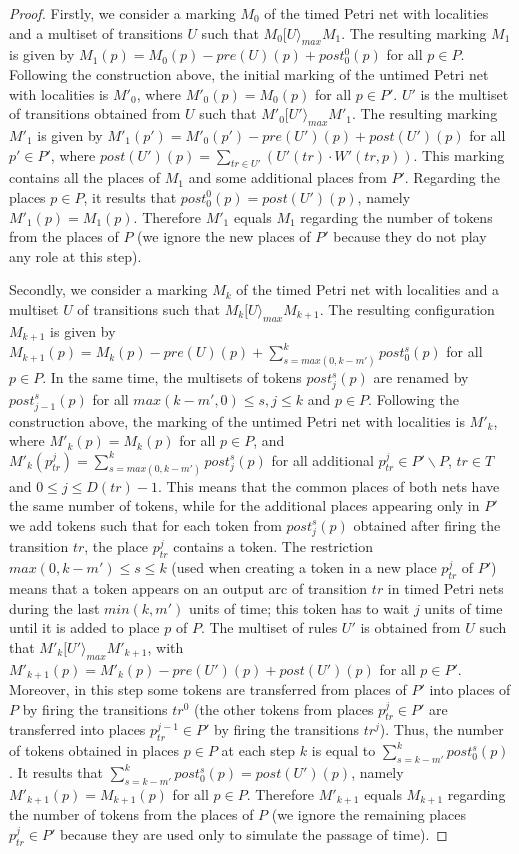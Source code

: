 \documentclass{eptcs}
\begin{document}
\begin{proof}
Firstly, we consider a marking $M_0$ of the timed Petri net with
localities and a multiset of transitions $U$ such that $M_0[U
\rangle_{max}M_{1}$. The resulting marking $M_{1}$ is given by
$M_1(p)=M_0(p)-pre(U)(p)+post^0_{0}(p)$ for all $p\in P$. Following
the construction above, the initial marking of the untimed Petri net
with localities is $M'_0$, where $M'_0(p)=M_0(p)$ for all $p \in P'$.
$U'$ is the multiset of transitions obtained from $U$ such that
$M'_0[U' \rangle_{max}M'_{1}$. The resulting marking $M'_{1}$ is
given by $M'_1(p')=M'_0(p')-pre(U')(p)+post(U')(p)$ for all $p'\in
P'$, where $post(U')(p)=\sum_{tr\in U'}( U'(tr) \cdot W'(tr,p))$.
This marking contains all the places of $M_1$ and some additional
places from $P'$. Regarding the places $p\in P$, it results that
$post^0_{0}(p)=post(U')(p)$, namely $M'_1(p)=M_1(p)$. Therefore
$M'_1$ equals $M_1$ regarding the number of tokens from the places
of $P$ (we ignore the new places of $P'$ because they do not play
any role at this step).

Secondly, we consider a marking $M_k$ of the timed Petri net with localities
and a multiset $U$ of transitions such that $M_k[U \rangle_{max}M_{k+1}$. The
resulting configuration $M_{k+1}$ is given by $M_{k+1}(p)=M_k(p)-pre(U)(p)+
\sum^k_{s=max(0,k-m')}post^s_{0}(p)$ for all $p\in P$. In the same time, the
multisets of tokens $post^s_{j}(p)$ are renamed by $post^{s}_{j-1}(p)$ for all
$max(k-m',0) \leq s,j \leq k$ and $p\in P$. Following the construction above,
the marking of the untimed Petri net with localities is $M'_k$, where
$M'_k(p)=M_k(p)$ for all $p\in P$, and $M'_k(p^j_{tr})=\sum^{k}_{s=max(0,k-m')}
post^{s}_{j}(p)$ for all additional $p^j_{tr} \in P'\backslash P$, $tr\in T$
and $0\leq j \leq D(tr)-1$. This means that the common places of both nets have
the same number of tokens, while for the additional places appearing only in
$P'$ we add tokens such that for each token from $post^{s}_{j}(p)$ obtained
after firing the transition $tr$, the place $p^{j}_{tr}$ contains a token. The
restriction $max(0,k-m') \leq s\leq k$ (used when creating a token in a new
place $p^{j}_{tr}$ of $P'$) means that a token appears on an output arc of
transition $tr$ in timed Petri nets during the last $min(k,m')$ units of time;
this token has to wait $j$ units of time until it is added to place $p$ of $P$.
The multiset of rules $U'$ is obtained from $U$ such that $M'_k[U'
\rangle_{max}M'_{k+1}$, with $M'_{k+1}(p)=M'_{k}(p)-pre(U')(p)+post(U')(p)$ for
all $p\in P'$. Moreover, in this step some tokens are transferred from places
of $P'$ into places of $P$ by firing the transitions $tr^0$ (the other tokens
from places $p^j_{tr}\in P'$ are transferred into places $p^{j-1}_{tr}\in P'$
by firing the transitions $tr^j$). Thus, the number of tokens obtained in
places $p\in P$ at each step $k$ is equal to $\sum^k_{s=k-m'}post^s_{0}(p)$. It
results that $\sum^k_{s=k-m'}post^s_{0}(p)=post(U')(p)$, namely
$M'_{k+1}(p)=M_{k+1}(p)$ for all $p\in P$. Therefore $M'_{k+1}$ equals
$M_{k+1}$ regarding the number of tokens from the places of $P$ (we ignore the
remaining places $p^j_{tr}\in P'$ because they are used only to simulate the
passage of time).
\end{proof}
\end{document}
